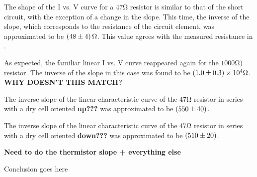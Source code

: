 \begin{paper}
	The shape of the I vs. V curve for a \( 47 \si{\ohm} \)  resistor is similar to that of the short circuit, with the exception of a change in the slope. This time, the inverse of the slope, which corresponds to the resistance of the circuit element, was approximated to be \( \left(48 \pm 4\right) \si{\ohm} \). This value agrees with the measured resistance in \figResistances.
	
	As expected, the familiar linear I vs. V curve reappeared again for the \( 1000 \si{\ohm} \)) resistor. The inverse of the slope in this case was found to be \( \left(1.0 \pm 0.3\right) \times 10^4 \si{\ohm} \). \textbf{WHY DOESN'T THIS MATCH?}
	
	The inverse slope of the linear characteristic curve of the \( 47 \si{\ohm} \) resistor in series with a dry cell oriented \textbf{up???} was approximated to be \( \left(550 \pm 40 \right) \).
	
	The inverse slope of the linear characteristic curve of the \( 47 \si{\ohm} \) resistor in series with a dry cell oriented \textbf{down???} was approximated to be \( \left(510 \pm 20 \right) \).
	
	\textbf{Need to do the thermistor slope + everything else}
	

	Conclusion goes here
	


\end{paper}
